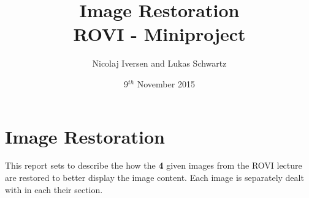 \documentclass[12pt,a4paper,conference]{IEEEtran}
\begin{document}
\raggedbottom

\title{Image Restoration\\ \large{ROVI - Miniproject}}
\author{Nicolaj Iversen and Lukas Schwartz}
\date{9$^{th}$ November 2015}

\maketitle

\section{Image Restoration}
This report sets to describe the how the \textbf{4} given images from the ROVI lecture are restored to better display the image content.
Each image is separately dealt with in each their section.











\end{document}

